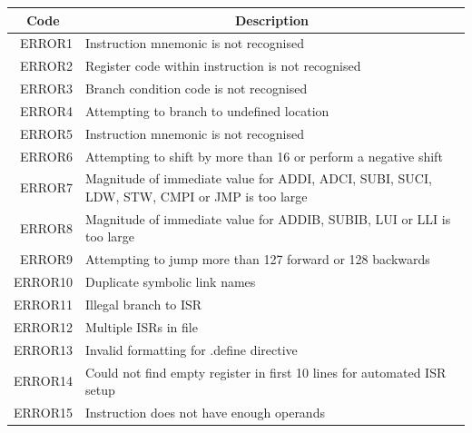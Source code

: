 \begin{center}
	\centering
	\begin{tabular}{r|p{12cm}}
		\multicolumn{1}{c}{\bf Code} & \multicolumn{1}{c}{\bf Description} \\
		\hline\hline
		ERROR1& Instruction mnemonic is not recognised \\
		ERROR2& Register code within instruction is not recognised\\
		ERROR3& Branch condition code is not recognised\\
		ERROR4& Attempting to branch to undefined location \\
		ERROR5& Instruction mnemonic is not recognised \\
		ERROR6& Attempting to shift by more than 16 or perform a negative shift \\
		ERROR7& Magnitude of immediate value for ADDI, ADCI, SUBI, SUCI, LDW, STW, CMPI or JMP is too large\\
		ERROR8& Magnitude of immediate value for ADDIB, SUBIB, LUI or LLI is too large \\
		ERROR9& Attempting to jump more than 127 forward or 128 backwards \\
		ERROR10& Duplicate symbolic link names \\
		ERROR11& Illegal branch to ISR \\
		ERROR12& Multiple ISRs in file \\
		ERROR13& Invalid formatting for .define directive \\
		ERROR14& Could not find empty register in first 10 lines for automated ISR setup \\
		ERROR15& Instruction does not have enough operands \\
	\end{tabular}
\end{center}
